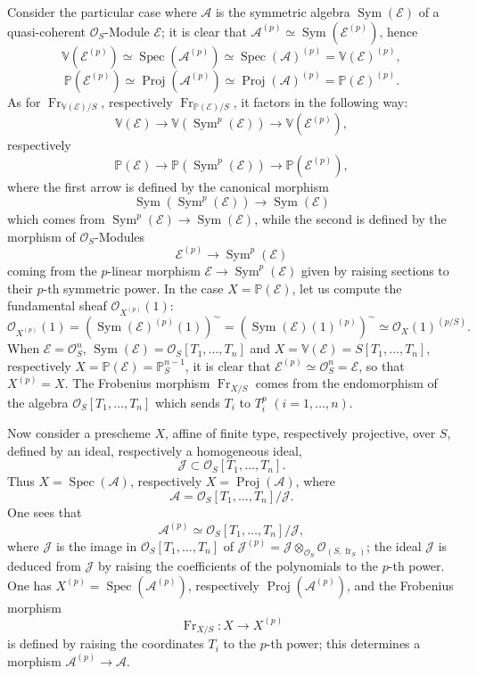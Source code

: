 \documentclass[11pt]{article}
\DeclareMathOperator{\Spec}{Spec}
\providecommand{\OO}{\mathcal{O}}
\providecommand{\cE}{\mathcal E}
\providecommand{\Spec}{\operatorname{Spec}}
\providecommand{\Sym}{\operatorname{Sym}}
\providecommand{\Spec}{\operatorname{Spec}}
\providecommand{\Spec}{\operatorname{Spec}}
\providecommand{\fr}{\operatorname{fr}}
\providecommand{\Fr}{\operatorname{Fr}}
\providecommand{\Proj}{\operatorname{Proj}}
\providecommand{\Sym}{\operatorname{Sym}}
\providecommand{\JJ}{\mathcal J}
\providecommand{\Fr}{\operatorname{Fr}}
\providecommand{\fr}{\operatorname{fr}}
\providecommand{\Spec}{\operatorname{Spec}}
\begin{document}
Consider the particular case where $\mathcal{A}$ is the symmetric algebra $\Sym(\cE)$ of a quasi-coherent $\OO_S$-Module $\cE$; it is clear that $\mathcal{A}^{(p)}\simeq\Sym(\cE^{(p)})$, hence
\[
\mathbb V(\cE^{(p)})\simeq\Spec(\mathcal{A}^{(p)})\simeq\Spec(\mathcal{A})^{(p)}=\mathbb V(\cE)^{(p)},
\]
\[
\mathbb P(\cE^{(p)})\simeq\Proj(\mathcal{A}^{(p)})\simeq\Proj(\mathcal{A})^{(p)}=\mathbb P(\cE)^{(p)}.
\]
As for $\Fr_{\mathbb V(\cE)/S}$, respectively $\Fr_{\mathbb P(\cE)/S}$, it factors in the following way:
\[
\mathbb V(\cE)\longrightarrow \mathbb V(\Sym^p(\cE))\longrightarrow \mathbb V(\cE^{(p)}),
\]
respectively
\[
\mathbb P(\cE)\longrightarrow \mathbb P(\Sym^p(\cE))\longrightarrow \mathbb P(\cE^{(p)}),
\]
where the first arrow is defined by the canonical morphism
\[
\Sym(\Sym^p(\cE))\longrightarrow \Sym(\cE)
\]
which comes from $\Sym^p(\cE)\to\Sym(\cE)$, while the second is defined by the morphism of $\OO_S$-Modules
\[
\cE^{(p)}\longrightarrow \Sym^p(\cE)
\]
coming from the $p$-linear morphism $\cE\to\Sym^p(\cE)$ given by raising sections to their $p$-th symmetric power. In the case $X=\mathbb P(\cE)$, let us compute the fundamental sheaf $\OO_{X^{(p)}}(1)$:
\[
\OO_{X^{(p)}}(1)=(\Sym(\cE)^{(p)}(1))^{\sim}
=(\Sym(\cE)(1)^{(p)})^{\sim}
\simeq \OO_X(1)^{(p/S)}.
\]
When $\cE=\OO_S^n$, $\Sym(\cE)=\OO_S[T_1,\ldots,T_n]$ and $X=\mathbb V(\cE)=S[T_1,\ldots,T_n]$, respectively $X=\mathbb P(\cE)=\mathbb P_S^{n-1}$, it is clear that $\cE^{(p)}\simeq\OO_S^n=\cE$, so that $X^{(p)}=X$. The Frobenius morphism $\Fr_{X/S}$ comes from the endomorphism of the algebra $\OO_S[T_1,\ldots,T_n]$ which sends $T_i$ to $T_i^p$ $(i=1,\ldots,n)$.

Now consider a prescheme $X$, affine of finite type, respectively projective, over $S$, defined by an ideal, respectively a homogeneous ideal,
\[
\JJ\subset \OO_S[T_1,\ldots,T_n].
\]
Thus $X=\Spec(\mathcal{A})$, respectively $X=\Proj(\mathcal{A})$, where
\[
\mathcal{A}=\OO_S[T_1,\ldots,T_n]/\JJ.
\]
One sees that
\[
\mathcal{A}^{(p)}
\simeq \OO_S[T_1,\ldots,T_n]/\mathscr{J},
\]
where $\mathscr{J}$ is the image in $\OO_S[T_1,\ldots,T_n]$ of
$\JJ^{(p)}=\JJ\otimes_{\OO_S}\OO_{(S,\fr_S)}$; the ideal $\mathscr{J}$ is
deduced from $\JJ$ by raising the coefficients of the polynomials to
the $p$-th power. One has $X^{(p)}=\Spec(\mathcal{A}^{(p)})$, respectively $\Proj(\mathcal{A}^{(p)})$, and the Frobenius morphism
\[
\Fr_{X/S}:X\longrightarrow X^{(p)}
\]
is defined by raising the coordinates $T_i$ to the $p$-th power; this determines a morphism $\mathcal{A}^{(p)}\to\mathcal{A}$.
\end{document}
